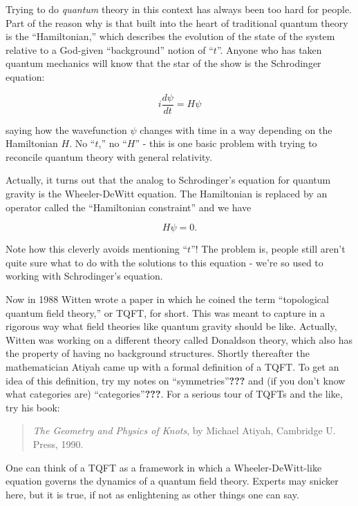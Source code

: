 \documentclass{article}
\begin{document}
Trying to do \emph{quantum} theory in this context has always been too
hard for people. Part of the reason why is that built into the heart of
traditional quantum theory is the ``Hamiltonian,'' which describes the
evolution of the state of the system relative to a God-given
``background'' notion of ``\(t\)''. Anyone who has taken quantum
mechanics will know that the star of the show is the Schrodinger
equation:

\[i\frac{d\psi}{dt} = H\psi\]

saying how the wavefunction \(\psi\) changes with time in a way
depending on the Hamiltonian \(H\). No ``\(t\),'' no ``\(H\)'' - this is
one basic problem with trying to reconcile quantum theory with general
relativity.

Actually, it turns out that the analog to Schrodinger's equation for
quantum gravity is the Wheeler-DeWitt equation. The Hamiltonian is
replaced by an operator called the ``Hamiltonian constraint'' and we
have

\[H\psi = 0.\]

Note how this cleverly avoids mentioning ``\(t\)''! The problem is,
people still aren't quite sure what to do with the solutions to this
equation - we're so used to working with Schrodinger's equation.

Now in 1988 Witten wrote a paper in which he coined the term
``topological quantum field theory,'' or TQFT, for short. This was meant
to capture in a rigorous way what field theories like quantum gravity
should be like. Actually, Witten was working on a different theory
called Donaldson theory, which also has the property of having no
background structures. Shortly thereafter the mathematician Atiyah came
up with a formal definition of a TQFT. To get an idea of this
definition, try my notes on ``symmetries''\textbf{???} and (if you don't
know what categories are) ``categories''\textbf{???}. For a serious tour
of TQFTs and the like, try his book:

\begin{quote}
\emph{The Geometry and Physics of Knots}, by Michael Atiyah, Cambridge
U. Press, 1990.
\end{quote}

One can think of a TQFT as a framework in which a Wheeler-DeWitt-like
equation governs the dynamics of a quantum field theory. Experts may
snicker here, but it is true, if not as enlightening as other things one
can say.
\end{document}
